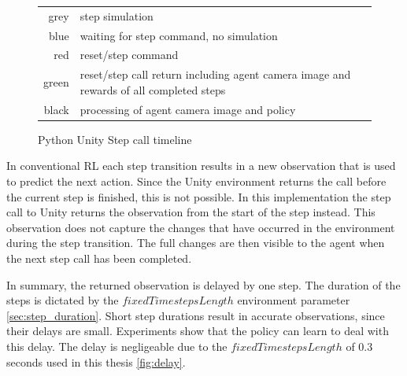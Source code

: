 \begin{figure}[h]
    \begin{tabular}{r@{: }l}
        grey & step simulation                                    \\
        blue & waiting for step command, no simulation \\
        red  & reset/step command\\
        green  & reset/step call return including agent camera image and rewards of all completed steps \\
        black & processing of agent camera image and policy \\
    \end{tabular}
    \caption{Python Unity Step call timeline}
    \label{fig:step_call_timeline}
\end{figure}

In conventional \ac{RL} each step transition results in a new observation that is used to predict the next action. Since the Unity environment returns the call before the current step is finished, this is not possible. In this implementation the step call to Unity returns the observation from the start of the step instead. This observation does not capture the changes that have occurred in the environment during the step transition. The full changes are then visible to the agent when the next step call has been completed. 

In summary, the returned observation is delayed by one step. The duration of the steps is dictated by the $fixedTimestepsLength$ environment parameter \ref{sec:step_duration}. Short step durations result in accurate observations, since their delays are small.
Experiments show that the policy can learn to deal with this delay. The delay is negligeable due to the $fixedTimestepsLength$ of 0.3 seconds used in this thesis \ref{fig:delay}.

